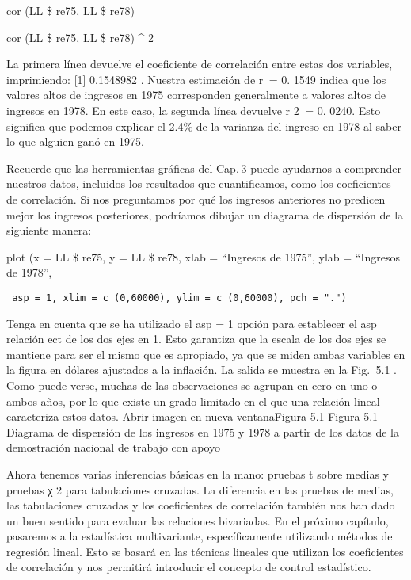 \documentclass[
]{book}
\begin{document}
cor (LL \$ re75, LL \$ re78)

cor (LL \$ re75, LL \$ re78) \^{} 2

La primera línea devuelve el coeficiente de correlación entre estas dos variables, imprimiendo: {[}1{]} 0.1548982 . Nuestra estimación de r  = 0. 1549 indica que los valores altos de ingresos en 1975 corresponden generalmente a valores altos de ingresos en 1978. En este caso, la segunda línea devuelve r 2  = 0. 0240. Esto significa que podemos explicar el 2.4\% de la varianza del ingreso en 1978 al saber lo que alguien ganó en 1975.

Recuerde que las herramientas gráficas del Cap. 3 puede ayudarnos a comprender nuestros datos, incluidos los resultados que cuantificamos, como los coeficientes de correlación. Si nos preguntamos por qué los ingresos anteriores no predicen mejor los ingresos posteriores, podríamos dibujar un diagrama de dispersión de la siguiente manera:

plot (x = LL \$ re75, y = LL \$ re78, xlab = ``Ingresos de 1975'', ylab = ``Ingresos de 1978'',

\begin{verbatim}
 asp = 1, xlim = c (0,60000), ylim = c (0,60000), pch = ".")
\end{verbatim}

Tenga en cuenta que se ha utilizado el asp = 1 opción para establecer el asp relación ect de los dos ejes en 1. Esto garantiza que la escala de los dos ejes se mantiene para ser el mismo que es apropiado, ya que se miden ambas variables en la figura en dólares ajustados a la inflación. La salida se muestra en la Fig.  5.1 . Como puede verse, muchas de las observaciones se agrupan en cero en uno o ambos años, por lo que existe un grado limitado en el que una relación lineal caracteriza estos datos.
Abrir imagen en nueva ventanaFigura 5.1
Figura 5.1
Diagrama de dispersión de los ingresos en 1975 y 1978 a partir de los datos de la demostración nacional de trabajo con apoyo

Ahora tenemos varias inferencias básicas en la mano: pruebas t sobre medias y pruebas χ 2 para tabulaciones cruzadas. La diferencia en las pruebas de medias, las tabulaciones cruzadas y los coeficientes de correlación también nos han dado un buen sentido para evaluar las relaciones bivariadas. En el próximo capítulo, pasaremos a la estadística multivariante, específicamente utilizando métodos de regresión lineal. Esto se basará en las técnicas lineales que utilizan los coeficientes de correlación y nos permitirá introducir el concepto de control estadístico.
\end{document}
